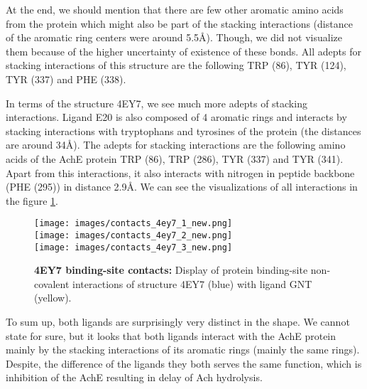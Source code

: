 \documentclass[10pt,a4paper,twocolumn]{article}
\begin{document}
At the end, 
we should mention that there are few other aromatic amino acids 
from the protein which might also be part of the stacking 
interactions (distance of the aromatic ring centers were around 5.5\AA). 
Though, we did not visualize them because of the 
higher uncertainty of existence of these bonds. All adepts for
stacking interactions of this structure are the following 
TRP (86), TYR (124), TYR (337) and PHE (338).

In terms of the structure 4EY7, we see much more adepts of stacking 
interactions. Ligand E20 is also composed of 4 aromatic rings and interacts by 
stacking interactions with tryptophans and tyrosines of the protein
(the distances are around 34\AA). The adepts for stacking interactions
are the following amino acids of the AchE protein 
TRP (86), TRP (286), TYR (337) and TYR (341).
Apart from this interactions, 
it also interacts with nitrogen in peptide backbone (PHE (295)) 
in distance 2.9\AA. We can see the visualizations
of all interactions in the figure \ref{fig:4ey7_contacts}. 


\begin{figure}[tb]
    \centering
    \texttt{[image: images/contacts\_4ey7\_1\_new.png]}
    \\[\smallskipamount]
    \texttt{[image: images/contacts\_4ey7\_2\_new.png]}
    \\[\smallskipamount]
    \texttt{[image: images/contacts\_4ey7\_3\_new.png]}
    \caption{\textbf{4EY7 binding-site contacts:} 
    Display of protein binding-site non-covalent interactions 
    of structure 4EY7 (blue) with ligand GNT (yellow).}
    \label{fig:4ey7_contacts}
\end{figure} 
  

To sum up, both ligands are surprisingly very distinct in the shape.
We cannot state for sure, but it looks that both ligands interact
with the AchE protein mainly by the stacking interactions of its
aromatic rings (mainly the same rings). 
Despite, the difference of the ligands they both 
serves the same function, which is inhibition of the AchE resulting
in delay of Ach hydrolysis. 


\clearpage


\end{document}
